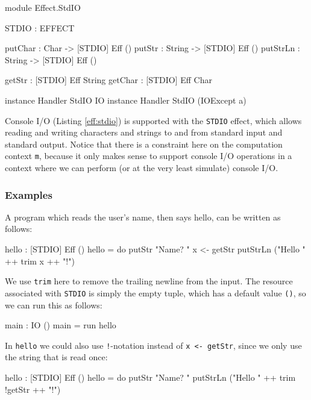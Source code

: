 \begin{code}[float=h,frame=single, caption={Console I/O Effect}, label=eff:stdio]
module Effect.StdIO

STDIO : EFFECT

putChar  : Char ->   { [STDIO] } Eff ()
putStr   : String -> { [STDIO] } Eff ()
putStrLn : String -> { [STDIO] } Eff ()

getStr   :           { [STDIO] } Eff String
getChar  :           { [STDIO] } Eff Char

instance Handler StdIO IO
instance Handler StdIO (IOExcept a)
\end{code}

\noindent
Console I/O (Listing \ref{eff:stdio})
is supported with the \texttt{STDIO} effect, which allows reading
and writing characters and strings to and from standard input and standard
output. Notice that there is a constraint here on the computation context
\texttt{m}, because it only makes sense to support console I/O operations in
a context where we can perform (or at the very least simulate) console I/O.

\subsubsection*{Examples}

A program which reads the user's name, then says hello, can be written
as follows:

\begin{code}
hello : { [STDIO] } Eff ()
hello = do putStr "Name? "
           x <- getStr
           putStrLn ("Hello " ++ trim x ++ "!")
\end{code}

\noindent
We use \texttt{trim} here to remove the trailing newline from the input.
The resource associated with \texttt{STDIO} is simply the empty tuple, which
has a default value \texttt{()}, so we can run this as follows:

\begin{code}
main : IO ()
main = run hello
\end{code}

\noindent
In \texttt{hello} we could also use \texttt{!}-notation instead of \texttt{x <-
getStr}, since we only use the string that is read once:

\begin{code}
hello : { [STDIO] } Eff ()
hello = do putStr "Name? "
           putStrLn ("Hello " ++ trim !getStr ++ "!")
\end{code}

